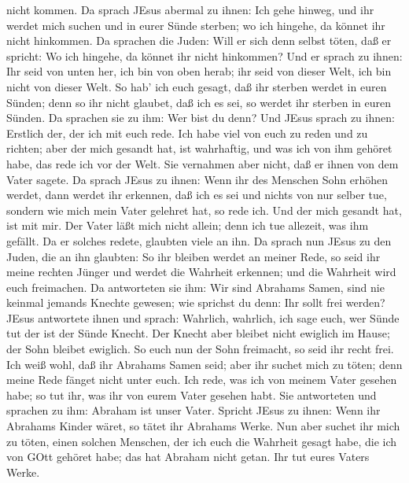 nicht kommen.  Da sprach JEsus abermal zu ihnen: Ich gehe
hinweg, und ihr werdet mich suchen und in eurer Sünde sterben; wo ich
hingehe, da könnet ihr nicht hinkommen.  Da sprachen die
Juden: Will er sich denn selbst töten, daß er spricht: Wo ich hingehe,
da könnet ihr nicht hinkommen?  Und er sprach zu ihnen: Ihr
seid von unten her, ich bin von oben herab; ihr seid von dieser Welt,
ich bin nicht von dieser Welt.  So hab' ich euch gesagt,
daß ihr sterben werdet in euren Sünden; denn so ihr nicht glaubet, daß
ich es sei, so werdet ihr sterben in euren Sünden.  Da
sprachen sie zu ihm: Wer bist du denn? Und JEsus sprach zu ihnen:
Erstlich der, der ich mit euch rede.  Ich habe viel von
euch zu reden und zu richten; aber der mich gesandt hat, ist wahrhaftig,
und was ich von ihm gehöret habe, das rede ich vor der Welt.
 Sie vernahmen aber nicht, daß er ihnen von dem Vater
sagete.  Da sprach JEsus zu ihnen: Wenn ihr des Menschen
Sohn erhöhen werdet, dann werdet ihr erkennen, daß ich es sei und nichts
von nur selber tue, sondern wie mich mein Vater gelehret hat, so rede
ich.  Und der mich gesandt hat, ist mit mir. Der Vater läßt
mich nicht allein; denn ich tue allezeit, was ihm gefällt. 
Da er solches redete, glaubten viele an ihn.  Da sprach nun
JEsus zu den Juden, die an ihn glaubten: So ihr bleiben werdet an meiner
Rede, so seid ihr meine rechten Jünger  und werdet die
Wahrheit erkennen; und die Wahrheit wird euch freimachen. 
Da antworteten sie ihm: Wir sind Abrahams Samen, sind nie keinmal
jemands Knechte gewesen; wie sprichst du denn: Ihr sollt frei werden?
 JEsus antwortete ihnen und sprach: Wahrlich, wahrlich, ich
sage euch, wer Sünde tut der ist der Sünde Knecht.  Der
Knecht aber bleibet nicht ewiglich im Hause; der Sohn bleibet ewiglich.
 So euch nun der Sohn freimacht, so seid ihr recht frei.
 Ich weiß wohl, daß ihr Abrahams Samen seid; aber ihr
suchet mich zu töten; denn meine Rede fänget nicht unter euch.
 Ich rede, was ich von meinem Vater gesehen habe; so tut
ihr, was ihr von eurem Vater gesehen habt.  Sie antworteten
und sprachen zu ihm: Abraham ist unser Vater. Spricht JEsus zu ihnen:
Wenn ihr Abrahams Kinder wäret, so tätet ihr Abrahams Werke.
 Nun aber suchet ihr mich zu töten, einen solchen Menschen,
der ich euch die Wahrheit gesagt habe, die ich von GOtt gehöret habe;
das hat Abraham nicht getan.  Ihr tut eures Vaters Werke.
